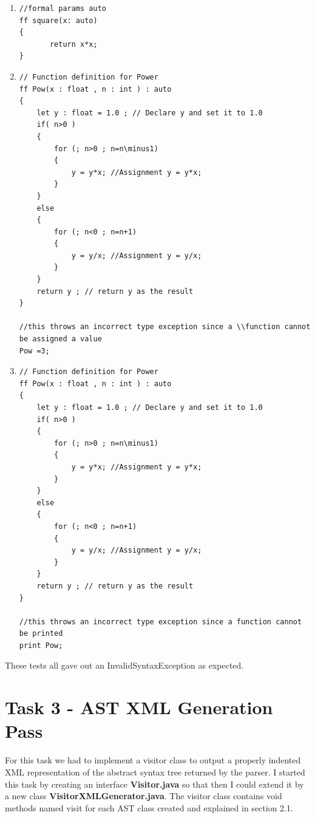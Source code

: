 \documentclass{article}
\begin{document}
\begin{enumerate}
					\item 
				\begin{lstlisting}[backgroundcolor=\color{lightgray}]
//formal params auto
ff square(x: auto)
{
 	   return x*x;		
}
				\end{lstlisting}
				
\item 
\begin{lstlisting}[backgroundcolor=\color{lightgray}]
// Function definition for Power
ff Pow(x : float , n : int ) : auto
{
    let y : float = 1.0 ; // Declare y and set it to 1.0
    if( n>0 )
    {
        for (; n>0 ; n=n\minus1)
        {
            y = y*x; //Assignment y = y*x;
        }
    }
    else
    {
        for (; n<0 ; n=n+1)
        {
            y = y/x; //Assignment y = y/x;
        }
    }
    return y ; // return y as the result
}

//this throws an incorrect type exception since a \\function cannot be assigned a value
Pow =3;
\end{lstlisting}

\item 
\begin{lstlisting}[backgroundcolor=\color{lightgray}]
// Function definition for Power
ff Pow(x : float , n : int ) : auto
{
    let y : float = 1.0 ; // Declare y and set it to 1.0
    if( n>0 )
    {
        for (; n>0 ; n=n\minus1)
        {
            y = y*x; //Assignment y = y*x;
        }
    }
    else
    {
        for (; n<0 ; n=n+1)
        {
            y = y/x; //Assignment y = y/x;
        }
    }
    return y ; // return y as the result
}

//this throws an incorrect type exception since a function cannot be printed
print Pow;
\end{lstlisting}
				
				
				
				\end{enumerate}
				
				These tests all gave out an InvalidSyntaxException as expected.
				
				
			
				\section{Task 3 - AST XML Generation Pass}
				
				For this task we had to implement a visitor class to output a properly indented XML representation of the abstract syntax tree returned by the parser. I started this task by creating an interface \textbf{Visitor.java} so that then I could extend it by a new class \textbf{VisitorXMLGenerator.java}. The visitor class contains void methods named visit for each AST class created and explained in section 2.1.
				
\end{document}

